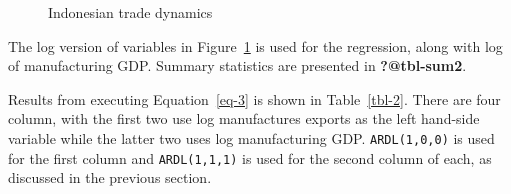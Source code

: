 \documentclass[
  letterpaper,
  DIV=11,
  numbers=noendperiod]{scrartcl}
\begin{document}
\begin{figure}


\caption{\label{fig-idn}Indonesian trade dynamics}

\end{figure}%

The log version of variables in Figure~\ref{fig-idn} is used for the
regression, along with log of manufacturing GDP. Summary statistics are
presented in \textbf{?@tbl-sum2}.

Results from executing Equation~\ref{eq-3} is shown in
Table~\ref{tbl-2}. There are four column, with the first two use log
manufactures exports as the left hand-side variable while the latter two
uses log manufacturing GDP. \texttt{ARDL(1,0,0)} is used for the first
column and \texttt{ARDL(1,1,1)} is used for the second column of each,
as discussed in the previous section.
\end{document}
